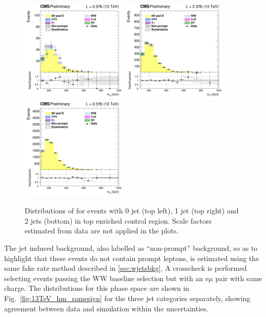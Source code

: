 \begin{figure}[htbp]
\centering
\includegraphics[width=0.45\textwidth]{images/13TeV/HighMass/cratio_hww2l2v_13TeV_top_of0j_mTi.png}
\includegraphics[width=0.45\textwidth]{images/13TeV/HighMass/cratio_hww2l2v_13TeV_top_of1j_mTi.png}
\includegraphics[width=0.45\textwidth]{images/13TeV/HighMass/cratio_hww2l2v_13TeV_top_of2j_mTi.png}
\caption{
Distributions of \mti for events with 0 jet (top left), 1 jet (top right)
and 2 jets (bottom) in top enriched control region.
Scale factors estimated from data are not applied in the plots. %
}
\label{fig:TopCtrl}
\end{figure}

The jet induced background, also labelled as ``non-prompt'' background, so as to highlight that these events do not contain prompt leptons, is estimated using the same fake rate method described in \ref{sec:wjetsbkg}. A crosscheck is performed selecting events passing the WW baseline selection but with an e$\mu$ pair with same charge. The \mti distributions for this phase space are shown in Fig.~\ref{fig:13TeV_hm_samesign} for the three jet categories separately, showing agreement between data and simulation within the uncertainties.

